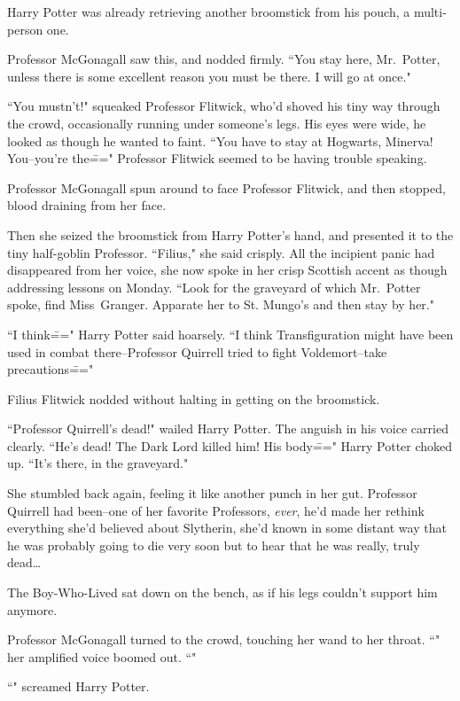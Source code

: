 Harry Potter was already retrieving another broomstick from his pouch, a multi-person one.

Professor McGonagall saw this, and nodded firmly. ``You stay here, Mr.~Potter, unless there is some excellent reason you must be there. I will go at once."

``You mustn't!" squeaked Professor Flitwick, who'd shoved his tiny way through the crowd, occasionally running under someone's legs. His eyes were wide, he looked as though he wanted to faint. ``You have to stay at Hogwarts, Minerva! You\---you're the\===" Professor Flitwick seemed to be having trouble speaking.

Professor McGonagall spun around to face Professor Flitwick, and then stopped, blood draining from her face.

Then she seized the broomstick from Harry Potter's hand, and presented it to the tiny half-goblin Professor. ``Filius," she said crisply. All the incipient panic had disappeared from her voice, she now spoke in her crisp Scottish accent as though addressing lessons on Monday. ``Look for the graveyard of which Mr.~Potter spoke, find Miss~Granger. Apparate her to St. Mungo's and then stay by her."

``I think\===" Harry Potter said hoarsely. ``I think Transfiguration might have been used in combat there\---Professor Quirrell tried to fight Voldemort\---take precautions\==="

Filius Flitwick nodded without halting in getting on the broomstick.

``Professor Quirrell's dead!" wailed Harry Potter. The anguish in his voice carried clearly. ``He's dead! The Dark Lord killed him! His body\===" Harry Potter choked up. ``It's there, in the graveyard."

She stumbled back again, feeling it like another punch in her gut. Professor Quirrell had been\---one of her favorite Professors, \emph{ever}, he'd made her rethink everything she'd believed about Slytherin, she'd known in some distant way that he was probably going to die very soon but to hear that he was really, truly dead{\ldots}

The Boy-Who-Lived sat down on the bench, as if his legs couldn't support him anymore.

Professor McGonagall turned to the crowd, touching her wand to her throat. ``" her amplified voice boomed out. ``"

``" screamed Harry Potter.


